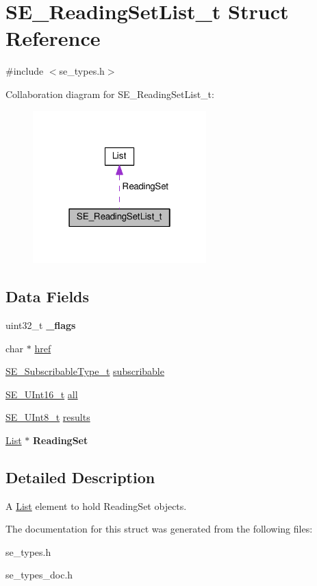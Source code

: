 \hypertarget{structSE__ReadingSetList__t}{}\section{S\+E\+\_\+\+Reading\+Set\+List\+\_\+t Struct Reference}
\label{structSE__ReadingSetList__t}


{\ttfamily \#include $<$se\+\_\+types.\+h$>$}



Collaboration diagram for S\+E\+\_\+\+Reading\+Set\+List\+\_\+t\+:\nopagebreak
\begin{figure}[H]
\begin{center}
\leavevmode
\includegraphics[width=190pt]{structSE__ReadingSetList__t__coll__graph}
\end{center}
\end{figure}
\subsection*{Data Fields}
\begin{DoxyCompactItemize}
\item 
uint32\+\_\+t {\bfseries \+\_\+flags}
\item 
char $\ast$ \hyperlink{group__ReadingSetList_ga0070650a5263a076d3ce35b922fc53ea}{href}
\item 
\hyperlink{group__SubscribableType_ga5c41f553d369710ed34619266bf2551e}{S\+E\+\_\+\+Subscribable\+Type\+\_\+t} \hyperlink{group__ReadingSetList_ga95a98662b6838987c7eece397b81f7d2}{subscribable}
\item 
\hyperlink{group__UInt16_gac68d541f189538bfd30cfaa712d20d29}{S\+E\+\_\+\+U\+Int16\+\_\+t} \hyperlink{group__ReadingSetList_ga1994d11924fcf8fc6a97155fa178c76f}{all}
\item 
\hyperlink{group__UInt8_gaf7c365a1acfe204e3a67c16ed44572f5}{S\+E\+\_\+\+U\+Int8\+\_\+t} \hyperlink{group__ReadingSetList_gab43c330676fe1ada7052c94c529d7e29}{results}
\item 
\hyperlink{structList}{List} $\ast$ {\bfseries Reading\+Set}
\end{DoxyCompactItemize}


\subsection{Detailed Description}
A \hyperlink{structList}{List} element to hold Reading\+Set objects. 

The documentation for this struct was generated from the following files\+:\begin{DoxyCompactItemize}
\item 
se\+\_\+types.\+h\item 
se\+\_\+types\+\_\+doc.\+h\end{DoxyCompactItemize}
